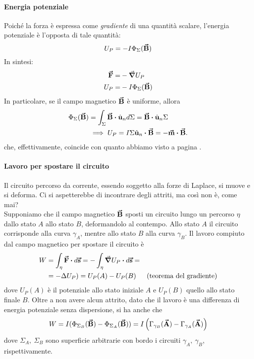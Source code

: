 \paragraph{Energia potenziale}
Poiché la forza è espressa come \textit{gradiente} di una quantità scalare, l'energia potenziale è l'opposta di tale quantità:
\begin{equation}
	U_P=-I\Phi_{\Sigma}(\vb*{\va{B}})
\end{equation}
In sintesi:
\begin{align}
	\vb*{\va{F}}=&-\grad{U_P}\\
	U_P=&-I\Phi_{\Sigma}(\vb*{\va{B}})
\end{align}
In particolare, se il campo magnetico $\vb*{\va{B}}$ è uniforme, allora
\begin{align*}
	\Phi_{\Sigma}(\vba{B})&=\int_{\Sigma}\vba{B}\vdot\vbh{u}_nd\Sigma=\vba{B}\vdot\vbh{u}_n \Sigma\\
	&\implies U_P=I\Sigma \vbh{u}_n \vdot \vba{B}=-\vba{m}\vdot\vba{B}. 
\end{align*}
che, effettivamente, coincide con quanto abbiamo visto a pagina \pageref{EnergiaPotenzialeCasoGeneralemanontroppo}.
\paragraph{Lavoro per spostare il circuito}
Il circuito percorso da corrente, essendo soggetto alla forze di Laplace, si muove e si deforma. Ci si aspetterebbe di incontrare degli attriti, ma così non è, come mai?\\
Supponiamo che il campo magnetico $\vb*{\va{B}}$ sposti un circuito lungo un percorso $\eta$ dallo stato $A$ allo stato $B$, deformandolo al contempo. Allo stato $A$ il circuito corrisponde alla curva $\gamma_A$, mentre allo stato $B$ alla curva $\gamma_B$. Il lavoro compiuto dal campo magnetico per spostare il circuito è
\begin{align*}
	W&=\int_{\eta}\vba{F}\vdot d\vba{s}=-\int_{\eta}\grad{U_P}\vdot d\vba{s}=&&\\
	&=-\Delta{U_P})=U_P(A)-U_P(B)&&\text{(teorema del gradiente)}
\end{align*}
dove $U_P(A)$ è il potenziale allo stato iniziale $A$ e $U_P(B)$ quello allo stato finale $B$. Oltre a non avere alcun attrito, dato che il lavoro è una differenza di energia potenziale senza dispersione, si ha anche che
\begin{equation}
	W=I(\Phi_{\Sigma_B}(\vb*{\va{B}})-\Phi_{\Sigma_A}(\vb*{\va{B}}))=I\left(\Gamma_{\gamma_B}(\vb*{\va{A}})-\Gamma_{\gamma_A}(\vb*{\va{A}})\right)
\end{equation}
dove $\Sigma_A,\ \Sigma_B$ sono superficie arbitrarie con bordo i circuiti $\gamma_A,\ \gamma_B$, rispettivamente.

